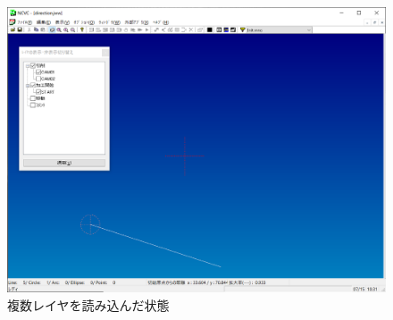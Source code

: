 \begin{figure}[H]
\centering
\includegraphics[scale=0.55]{No4/fig/direction.png}
\caption{複数レイヤを読み込んだ状態}
\label{fig:direction.png}
\end{figure}

